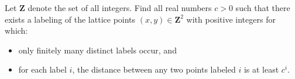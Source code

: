 Let $\mathbf{Z}$ denote the set of all integers. Find all real numbers $c > 0$ such that there exists a labeling of the lattice points $ ( x, y ) \in \mathbf{Z}^2$ with positive integers for which: 
\begin{itemize}
	\item only finitely many distinct labels occur, and
	\item for each label $i$, the distance between any two points labeled $i$ is at least $c^i$.
\end{itemize}